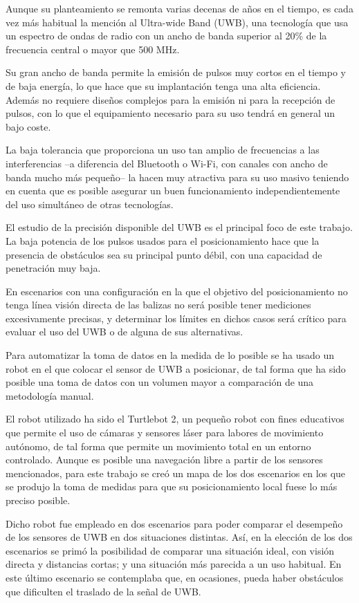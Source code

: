 Aunque su planteamiento se remonta varias decenas de años en el tiempo, es cada vez más habitual la mención al Ultra-wide Band (UWB), una tecnología que usa un espectro de ondas de radio con un ancho de banda superior al 20\% de la frecuencia central o mayor que 500 MHz.

Su gran ancho de banda permite la emisión de pulsos muy cortos en el tiempo y de baja energía, lo que hace que su implantación tenga una alta eficiencia.
Además no requiere diseños complejos para la emisión ni para la recepción de pulsos, con lo que el equipamiento necesario para su uso tendrá en general un bajo coste.

La baja tolerancia que proporciona un uso tan amplio de frecuencias a las interferencias --a diferencia del Bluetooth o Wi-Fi, con canales con ancho de banda mucho más pequeño-- la hacen muy atractiva para su uso masivo teniendo en cuenta que es posible asegurar un buen funcionamiento independientemente del uso simultáneo de otras tecnologías.

El estudio de la precisión disponible del UWB es el principal foco de este trabajo.
La baja potencia de los pulsos usados para el posicionamiento hace que la presencia de obstáculos sea su principal punto débil, con una capacidad de penetración muy baja.

En escenarios con una configuración en la que el objetivo del posicionamiento no tenga línea visión directa de las balizas no será posible tener mediciones excesivamente precisas, y determinar los límites en dichos casos será crítico para evaluar el uso del UWB o de alguna de sus alternativas.

Para automatizar la toma de datos en la medida de lo posible se ha usado un robot en el que colocar el sensor de UWB a posicionar, de tal forma que ha sido posible una toma de datos con un volumen mayor a comparación de una metodología manual.

El robot utilizado ha sido el Turtlebot 2, un pequeño robot con fines educativos que permite el uso de cámaras y sensores láser para labores de movimiento autónomo, de tal forma que permite un movimiento total en un entorno controlado.
Aunque es posible una navegación libre a partir de los sensores mencionados, para este trabajo se creó un mapa de los dos escenarios en los que se produjo la toma de medidas para que su posicionamiento local fuese lo más preciso posible.

Dicho robot fue empleado en dos escenarios para poder comparar el desempeño de los sensores de UWB en dos situaciones distintas.
Así, en la elección de los dos escenarios se primó la posibilidad de comparar una situación ideal, con visión directa y distancias cortas; y una situación más parecida a un uso habitual.
En este último escenario se contemplaba que, en ocasiones, pueda haber obstáculos que dificulten el traslado de la señal de UWB.

